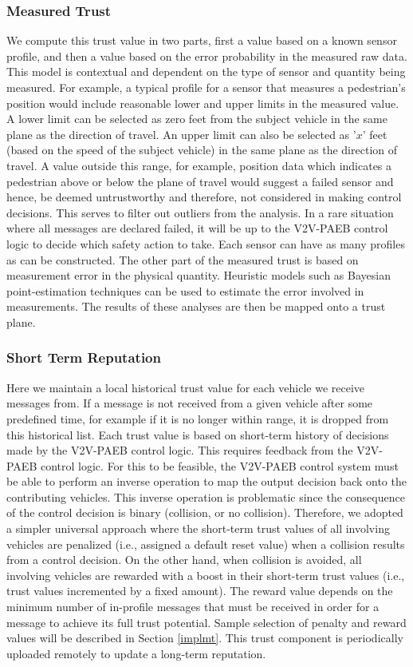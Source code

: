 \documentclass[conference]{IEEEtran}
\begin{document}
\subsubsection{Measured Trust}
We compute this trust value in two parts, first a value based on a known sensor profile, and then a value based on the error probability in the measured raw data. This model is contextual and dependent on the type of sensor and quantity being measured. For example, a typical profile for a sensor that measures a pedestrian's position would include reasonable lower and upper limits in the measured value. A lower limit can be selected as zero feet from the subject vehicle in the same plane as the direction of travel. An upper limit can also be selected as '$x$' feet (based on the speed of the subject vehicle) in the same plane as the direction of travel. A value outside this range, for example, position data which indicates a pedestrian above or below the plane of travel would suggest a failed sensor and hence, be deemed untrustworthy and therefore, not considered in making control decisions. This serves to filter out outliers from the analysis. In a rare situation where all messages are declared failed, it will be up to the V2V-PAEB control logic to decide which safety action to take. Each sensor can have as many profiles as can be constructed. The other part of the measured trust is based on measurement error in the physical quantity. Heuristic models such as Bayesian point-estimation techniques can be used to estimate the error involved in measurements. The results of these analyses are then be mapped onto a trust plane.

\subsubsection{Short Term Reputation}
Here we maintain a local historical trust value for each vehicle we receive messages from. If a message is not received from a given vehicle after some predefined time, for example if it is no longer within range, it is dropped from this historical list. Each trust value is based on short-term history of decisions made by the V2V-PAEB control logic. This requires feedback from the V2V-PAEB control logic. For this to be feasible, the V2V-PAEB control system must be able to perform an inverse operation to map the output decision back onto the contributing vehicles. This inverse operation is problematic since the consequence of the control decision is binary (collision, or no collision). Therefore, we adopted a simpler universal approach where the short-term trust values of all involving vehicles are penalized (i.e., assigned a default reset value) when a collision results from a control decision. On the other hand, when collision is avoided, all involving vehicles are rewarded with a boost in their short-term trust values (i.e., trust values incremented by a fixed amount). The reward value depends on the minimum number of in-profile messages that must be received in order for a message to achieve its full trust potential. Sample selection of penalty and reward values will be described in Section \ref{implmt}. This trust component is periodically uploaded remotely to update a long-term reputation.
\end{document}

